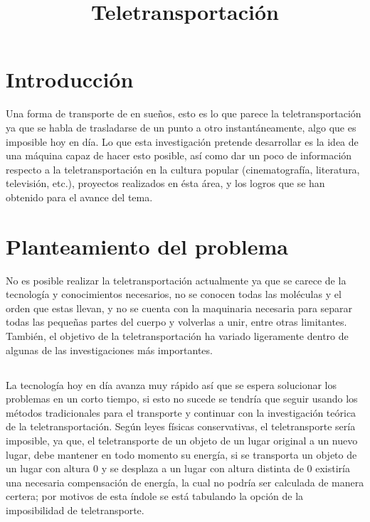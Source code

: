 \documentclass{bmcart}
\begin{document}
\begin{frontmatter}

\begin{fmbox}


\title{Teletransportación}


\author[
   email={tomas.perrin.rivemar@gmail.com}
]{ }



\begin{artnotes}
\end{artnotes}

\end{fmbox}%


\end{frontmatter}


\section*{Introducción}
Una forma de transporte de en sueños, esto es lo que parece la teletransportación ya que se habla de trasladarse de un punto a otro instantáneamente, algo que es imposible hoy en día.
Lo que esta investigación pretende desarrollar es la idea de una máquina capaz de hacer esto posible, así como dar un poco de información respecto a la teletransportación en la cultura popular (cinematografía, literatura, televisión, etc.), proyectos realizados en ésta área, y los logros que se han obtenido para el avance del tema.

\section*{Planteamiento del problema}
No es posible realizar la teletransportación actualmente ya que se carece de la tecnología y conocimientos necesarios, no se conocen todas las moléculas y el orden que estas llevan, y no se cuenta con la maquinaria necesaria para separar todas las pequeñas partes del cuerpo y volverlas a unir, entre otras limitantes. También, el objetivo de la teletransportación ha variado ligeramente dentro de algunas de las investigaciones más importantes.
\subsection*{}
La tecnología hoy en día avanza muy rápido así que se espera solucionar los problemas en un corto tiempo, si esto no sucede se tendría que seguir usando los métodos tradicionales para el transporte y continuar con la investigación teórica de la teletransportación.
Según leyes físicas conservativas, el teletransporte sería imposible, ya que, el teletransporte de un objeto de un lugar original a un nuevo lugar, debe mantener en todo momento su energía, si se transporta un objeto de un lugar con altura 0 y se desplaza a un lugar con altura distinta de 0 existiría una necesaria compensación de energía, la cual no podría ser calculada de manera certera; por motivos de esta índole se está tabulando la opción de la imposibilidad de teletransporte.
\end{document}
